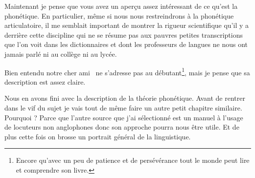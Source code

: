 Maintenant je pense que vous avez un aperçu assez intéressant de ce
qu'est la phonétique. En particulier, même si nous nous restreindrons
à la phonétique articulatoire, il me semblait important de montrer la
rigueur scientifique qu'il y a derrière cette discipline qui ne se
résume pas aux pauvres petites transcriptions que l'on voit dans les
dictionnaires et dont les professeurs de langues ne nous ont jamais
parlé ni au collège ni au lycée.

Bien entendu notre cher ami~\cite{lodge} ne s'adresse pas au
débutant\footnote{Encore qu'avec un peu de patience et de persévérance
tout le monde peut lire et comprendre son livre.}, mais je pense que sa
description est assez claire.

Nous en avons fini avec la description de la théorie phonétique. Avant
de rentrer dans le vif du sujet je vais tout de même faire un autre
petit chapitre similaire. Pourquoi ? Parce que l'autre source que j'ai
sélectionné est un manuel à l'usage de locuteurs non anglophones donc
son approche pourra nous être utile. Et de plus cette fois on brosse
un portrait général de la linguistique.

\newpage
\minitoc
\newpage

